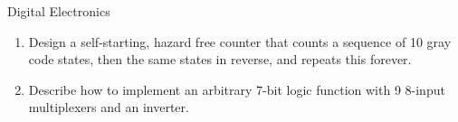 \documentclass{tripos}
\begin{document}
\begin{question}[MockIA,year=2025,paper=1,question=5,author=rrw]{Digital Electronics}

\begin{enumerate}
\item Design a self-starting, hazard free counter that counts a sequence of 10 gray code states, then the same states in reverse, and repeats this forever. 
\item Describe how to implement an arbitrary 7-bit logic function with 9 8-input multiplexers and an inverter. 
  \end{enumerate}
  \eject
\end{question}
\end{document}
